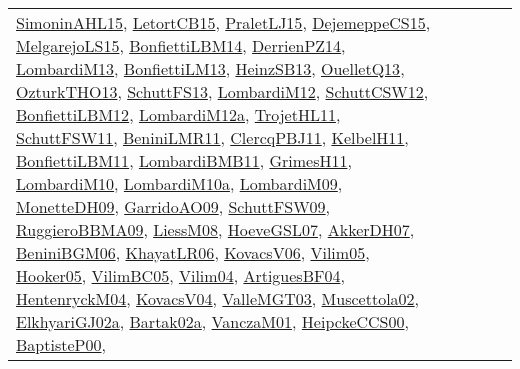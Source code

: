 {\begin{longtable}{lp{3cm}>{\raggedright}p{6cm}>{\raggedright}p{6cm}p{8cm}}
\href{articles/SimoninAHL15.pdf}{SimoninAHL15}\cite{SimoninAHL15}, \href{articles/LetortCB15.pdf}{LetortCB15}\cite{LetortCB15}, \href{papers/PraletLJ15.pdf}{PraletLJ15}\cite{PraletLJ15}, \href{papers/DejemeppeCS15.pdf}{DejemeppeCS15}\cite{DejemeppeCS15}, \href{papers/MelgarejoLS15.pdf}{MelgarejoLS15}\cite{MelgarejoLS15}, \href{articles/BonfiettiLBM14.pdf}{BonfiettiLBM14}\cite{BonfiettiLBM14}, \href{papers/DerrienPZ14.pdf}{DerrienPZ14}\cite{DerrienPZ14}, \href{papers/LombardiM13.pdf}{LombardiM13}\cite{LombardiM13}, \href{papers/BonfiettiLM13.pdf}{BonfiettiLM13}\cite{BonfiettiLM13}, \href{articles/HeinzSB13.pdf}{HeinzSB13}\cite{HeinzSB13}, \href{papers/OuelletQ13.pdf}{OuelletQ13}\cite{OuelletQ13}, \href{articles/OzturkTHO13.pdf}{OzturkTHO13}\cite{OzturkTHO13}, \href{papers/SchuttFS13.pdf}{SchuttFS13}\cite{SchuttFS13}, \href{articles/LombardiM12.pdf}{LombardiM12}\cite{LombardiM12}, \href{papers/SchuttCSW12.pdf}{SchuttCSW12}\cite{SchuttCSW12}, \href{papers/BonfiettiLBM12.pdf}{BonfiettiLBM12}\cite{BonfiettiLBM12}, \href{articles/LombardiM12a.pdf}{LombardiM12a}\cite{LombardiM12a}, \href{articles/TrojetHL11.pdf}{TrojetHL11}\cite{TrojetHL11}, \href{articles/SchuttFSW11.pdf}{SchuttFSW11}\cite{SchuttFSW11}, \href{articles/BeniniLMR11.pdf}{BeniniLMR11}\cite{BeniniLMR11}, \href{papers/ClercqPBJ11.pdf}{ClercqPBJ11}\cite{ClercqPBJ11}, \href{articles/KelbelH11.pdf}{KelbelH11}\cite{KelbelH11}, \href{papers/BonfiettiLBM11.pdf}{BonfiettiLBM11}\cite{BonfiettiLBM11}, \href{papers/LombardiBMB11.pdf}{LombardiBMB11}\cite{LombardiBMB11}, \href{papers/GrimesH11.pdf}{GrimesH11}\cite{GrimesH11}, \href{papers/LombardiM10.pdf}{LombardiM10}\cite{LombardiM10}, \href{articles/LombardiM10a.pdf}{LombardiM10a}\cite{LombardiM10a}, \href{papers/LombardiM09.pdf}{LombardiM09}\cite{LombardiM09}, \href{papers/MonetteDH09.pdf}{MonetteDH09}\cite{MonetteDH09}, \href{articles/GarridoAO09.pdf}{GarridoAO09}\cite{GarridoAO09}, \href{papers/SchuttFSW09.pdf}{SchuttFSW09}\cite{SchuttFSW09}, \href{articles/RuggieroBBMA09.pdf}{RuggieroBBMA09}\cite{RuggieroBBMA09}, \href{articles/LiessM08.pdf}{LiessM08}\cite{LiessM08}, \href{papers/HoeveGSL07.pdf}{HoeveGSL07}\cite{HoeveGSL07}, \href{papers/AkkerDH07.pdf}{AkkerDH07}\cite{AkkerDH07}, \href{papers/BeniniBGM06.pdf}{BeniniBGM06}\cite{BeniniBGM06}, \href{articles/KhayatLR06.pdf}{KhayatLR06}\cite{KhayatLR06}, \href{papers/KovacsV06.pdf}{KovacsV06}\cite{KovacsV06}, \href{papers/Vilim05.pdf}{Vilim05}\cite{Vilim05}, \href{articles/Hooker05.pdf}{Hooker05}\cite{Hooker05}, \href{articles/VilimBC05.pdf}{VilimBC05}\cite{VilimBC05}, \href{papers/Vilim04.pdf}{Vilim04}\cite{Vilim04}, \href{papers/ArtiguesBF04.pdf}{ArtiguesBF04}\cite{ArtiguesBF04}, \href{papers/HentenryckM04.pdf}{HentenryckM04}\cite{HentenryckM04}, \href{papers/KovacsV04.pdf}{KovacsV04}\cite{KovacsV04}, \href{papers/ValleMGT03.pdf}{ValleMGT03}\cite{ValleMGT03}, \href{papers/Muscettola02.pdf}{Muscettola02}\cite{Muscettola02}, \href{papers/ElkhyariGJ02a.pdf}{ElkhyariGJ02a}\cite{ElkhyariGJ02a}, \href{papers/Bartak02a.pdf}{Bartak02a}\cite{Bartak02a}, \href{papers/VanczaM01.pdf}{VanczaM01}\cite{VanczaM01}, \href{articles/HeipckeCCS00.pdf}{HeipckeCCS00}\cite{HeipckeCCS00}, \href{articles/BaptisteP00.pdf}{BaptisteP00}\cite{BaptisteP00}, 
\end{longtable}}
